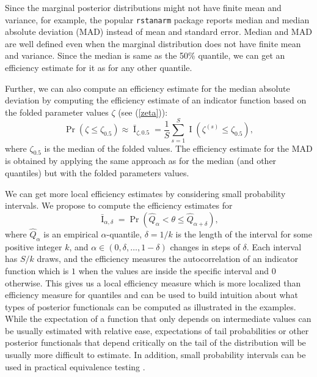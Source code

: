 \documentclass[american,]{article}
\DeclareMathOperator{\I}{I}
\theoremstyle{definition}
\begin{document}
Since the marginal posterior distributions might not have finite mean
and variance, for example, the popular \texttt{rstanarm} package
\citep{RStanARM.2.17} reports median and median absolute deviation (MAD)
instead of mean and standard error. Median and MAD are well defined
even when the marginal distribution does not have finite mean and
variance. Since the median is same as the 50\% quantile, we can get an
efficiency estimate for it as for any other quantile.

Further, we can also compute an efficiency estimate for the median
absolute deviation by computing the efficiency estimate of an
indicator function based on the folded parameter values \(\zeta\) (see
(\ref{zeta})):
\begin{equation}
\Pr(\zeta \leq \zeta_{0.5}) \approx \bar{\I}_{\zeta,0.5} = \frac{1}{S}\sum_{s=1}^S
\I(\zeta^{(s)} \leq \zeta_{0.5}),
\end{equation}
where \(\zeta_{0.5}\) is the median of the folded values. The efficiency estimate for the MAD is obtained by applying the same
approach as for the median (and other quantiles) but with the folded
parameters values.

We can get more local efficiency estimates by considering small
probability intervals. We propose to compute the efficiency estimates
for
\begin{equation}
\bar{\I}_{\alpha,\delta} = \Pr(\hat{Q}_\alpha < \theta \leq \hat{Q}_{\alpha+\delta}),
\end{equation}
where \(\hat{Q}_\alpha\) is an empirical \(\alpha\)-quantile,
\(\delta=1/k\) is the length of the interval for some positive integer
\(k\), and \(\alpha \in (0,\delta,\ldots,1-\delta)\) changes in steps of
\(\delta\). Each interval has \(S/k\) draws, and the efficiency measures
the autocorrelation of an indicator function which is \(1\) when the
values are inside the specific interval and \(0\) otherwise. This
gives us a local efficiency measure which is more localized than
efficiency measure for quantiles and can be used to build intuition
about what types of posterior functionals can be computed as
illustrated in the examples. While the expectation of a function that
only depends on intermediate values can be usually estimated with relative
ease, expectations of tail probabilities or other posterior
functionals that depend critically on the tail of the
distribution will be usually more difficult to estimate. In addition, small
probability intervals can be used in practical equivalence testing
\citep[see, e.g.,][]{Wellek:2010:testing}.
\end{document}
